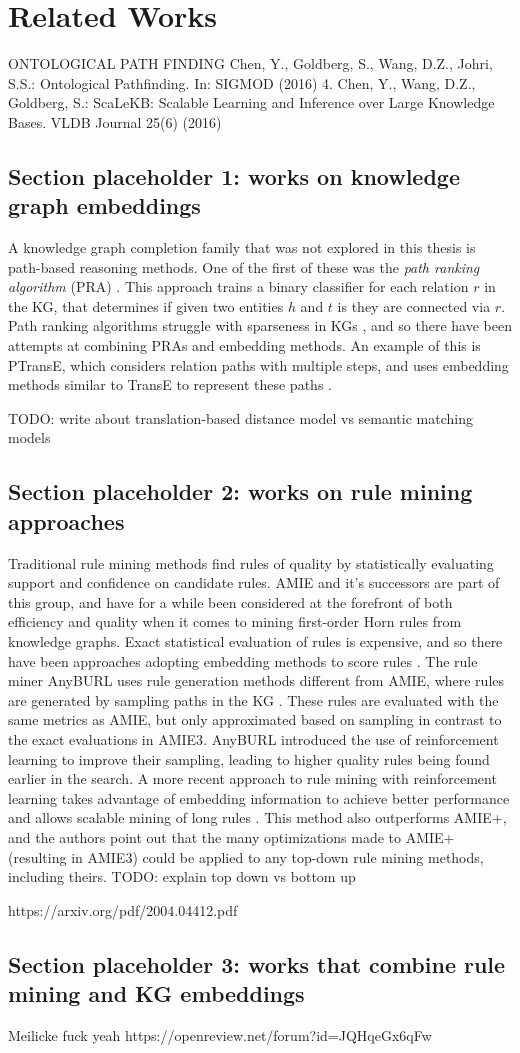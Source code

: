 \chapter{Related Works}

ONTOLOGICAL PATH FINDING
Chen, Y., Goldberg, S., Wang, D.Z., Johri, S.S.: Ontological Pathfinding. In: SIGMOD (2016) 
4. Chen, Y., Wang, D.Z., Goldberg, S.: ScaLeKB: Scalable Learning and Inference over Large Knowledge Bases. VLDB Journal 25(6) (2016)

\section{Section placeholder 1: works on knowledge graph embeddings}
A knowledge graph completion family that was not explored in this thesis is path-based reasoning methods. One of the first of these was the \textit{path ranking algorithm} (PRA) \cite{lao2011random}. This approach trains a binary classifier for each relation $r$ in the KG, that determines if given two entities $h$ and $t$ is they are connected via $r$. Path ranking algorithms struggle with sparseness in KGs \cite{ma2019elpkg}, and so there have been attempts at combining PRAs and embedding methods. An example of this is PTransE, which considers relation paths with multiple steps, and uses embedding methods similar to TransE to represent these paths \cite{lin2015modeling}. 

TODO: write about translation-based distance model vs semantic matching models

\section{Section placeholder 2: works on rule mining approaches}
Traditional rule mining methods find rules of quality by statistically evaluating support and confidence on candidate rules. AMIE and it's successors are part of this group, and have for a while been considered at the forefront of both efficiency and quality when it comes to mining first-order Horn rules from knowledge graphs. Exact statistical evaluation of rules is expensive, and so there have been approaches adopting embedding methods to score rules \cite{yang2014embedding. omran2018scalable, omran2019embedding}. The rule miner AnyBURL uses rule generation methods different from AMIE, where rules are generated by sampling paths in the KG \cite{meilicke2020reinforced}. These rules are evaluated with the same metrics as AMIE, but only approximated based on sampling in contrast to the exact evaluations in AMIE3. AnyBURL introduced the use of reinforcement learning to improve their sampling, leading to higher quality rules being found earlier in the search. A more recent approach to rule mining with reinforcement learning takes advantage of embedding information to achieve better performance and allows scalable mining of long rules \cite{chen2022rule}. This method also outperforms AMIE+, and the authors point out that the many optimizations made to AMIE+ (resulting in AMIE3) could be applied to any top-down rule mining methods, including theirs.  TODO: explain top down vs bottom up

https://arxiv.org/pdf/2004.04412.pdf

\section{Section placeholder 3: works that combine rule mining and KG embeddings}
Meilicke fuck yeah
https://openreview.net/forum?id=JQHqeGx6qFw